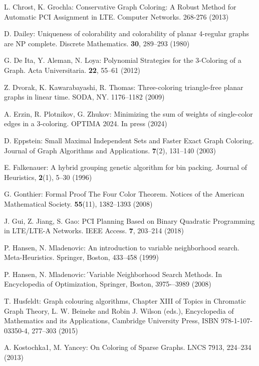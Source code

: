 \documentclass[runningheads]{llncs}
\begin{document}
\begin{thebibliography}{8}
 L. Chrost, K. Grochla: Conservative Graph Coloring: A Robust Method for Automatic PCI Assignment in LTE. Computer Networks. 268-276 (2013)

 D. Dailey: Uniqueness of colorability and colorability of planar 4-regular graphs are NP complete. Discrete Mathematics. \textbf{30}, 289--293 (1980)

 G. De Ita, Y. Aleman, N. Loya: Polynomial Strategies for the 3-Coloring of a Graph. Acta Universitaria. \textbf{22}, 55--61 (2012)

 Z. Dvorak, K. Kawarabayashi, R. Thomas: Three-coloring triangle-free planar graphs in linear time. SODA, NY. 1176--1182 (2009)

 A. Erzin, R. Plotnikov, G. Zhukov: Minimizing the sum of weights of single-color edges in a 3-coloring. OPTIMA 2024. In press (2024)

 D. Eppstein: Small Maximal Independent Sets and Faster Exact Graph Coloring. Journal of Graph Algorithms and Applications. \textbf{7}(2), 131--140 (2003)

 E. Falkenauer: A hybrid grouping genetic algorithm for bin packing. Journal of Heuristics, \textbf{2}(1), 5--30 (1996)

 G. Gonthier: Formal Proof The Four Color Theorem. Notices of the American Mathematical Society. \textbf{55}(11), 1382--1393 (2008)

 J. Gui, Z. Jiang, S. Gao: PCI Planning Based on Binary Quadratic Programming in LTE/LTE-A Networks. IEEE Access. \textbf{7}, 203--214 (2018)

 P. Hansen, N. Mladenovic: An introduction to variable neighborhood search. Meta-Heuristics. Springer, Boston, 433--458 (1999)

 P. Hansen, N. Mladenovic:´Variable Neighborhood Search Methods. In Encyclopedia of Optimization, Springer, Boston, 3975-–3989 (2008)

 T. Husfeldt: Graph colouring algorithms, Chapter XIII of Topics in Chromatic Graph Theory, L. W. Beineke and Robin J. Wilson (eds.), Encyclopedia of Mathematics and its Applications, Cambridge University Press, ISBN 978-1-107-03350-4, 277--303 (2015)

 A. Kostochka1, M. Yancey: On Coloring of Sparse Graphs. LNCS 7913, 224--234 (2013)


\end{thebibliography}
\end{document}
